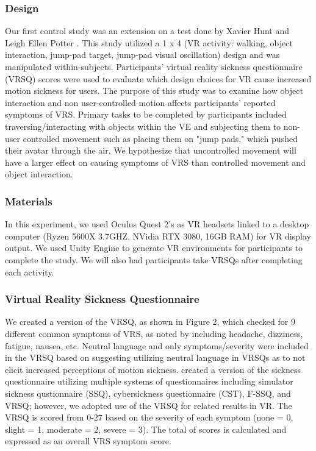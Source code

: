 \documentclass[sigconf]{acmart}
\begin{document}
\subsubsection{Design}
Our first control study was an extension on a test done by Xavier Hunt and Leigh Ellen Potter \cite{Hunt18}. This study utilized a 1 x 4 (VR activity: walking, object interaction, jump-pad target, jump-pad visual oscillation) design and was manipulated within-subjects. Participants' virtual reality sickness questionnaire (VRSQ) scores were used to evaluate which design choices for VR cause increased motion sickness for users. The purpose of this study was to examine how object interaction and non user-controlled motion affects participants' reported symptoms of VRS. Primary tasks to be completed by participants included traversing/interacting with objects within the VE and subjecting them to non-user controlled movement such as placing them on "jump pads," which pushed their avatar through the air. We hypothesize that uncontrolled movement will have a larger effect on causing symptoms of VRS than controlled movement and object interaction.

\subsubsection{Materials}
In this experiment, we used Oculus Quest 2’s as VR headsets linked to a desktop computer (Ryzen 5600X 3.7GHZ, NVidia RTX 3080, 16GB RAM) for VR display output. We used Unity Engine to generate VR environments for participants to complete the study. We will also had participants take VRSQs after completing each activity.

\subsubsection{Virtual Reality Sickness Questionnaire}
We created a version of the VRSQ, as shown in Figure 2, which checked for 9 different common symptoms of VRS, as noted by \cite{keshavarz11, jang22} including headache, dizziness, fatigue, nausea, etc. Neutral language and only symptoms/severity were included in the VRSQ based on \cite{keshavarz11} suggesting utilizing neutral language in VRSQs as to not elicit increased perceptions of motion sickness. \cite{sevinc20} created a version of the sickness questionnaire utilizing multiple systems of questionnaires including simulator sickness qustionnaire (SSQ), cybersickness questionnaire (CST), F-SSQ, and VRSQ; however, we adopted use of the VRSQ for related results in VR. The VRSQ is scored from 0-27 based on the severity of each symptom (none = 0, slight = 1, moderate = 2, severe = 3). The total of scores is calculated and expressed as an overall VRS symptom score. 
\end{document}
